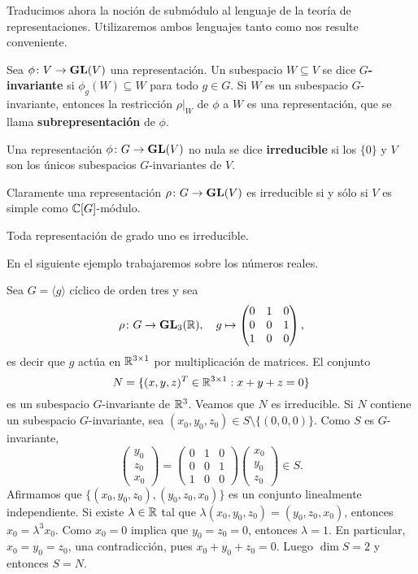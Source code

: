 Traducimos ahora la noción de submódulo al lenguaje de la teoría de representaciones. 
Utilizaremos ambos lenguajes tanto como nos resulte conveniente. 

\begin{definition}
Sea $\phi\colon V\to\mathbf{GL}(V)$ una representación. 
Un subespacio $W\subseteq V$ se dice
\textbf{$G$-invariante} si $\phi_g(W)\subseteq W$ para todo $g\in G$.  Si $W$
es un subespacio $G$-invariante, entonces la restricción $\rho|_W$ de $\phi$
a $W$ es una representación, que se llama \textbf{subrepresentación} de
$\phi$.
\end{definition}

\begin{definition}
Una representación $\phi\colon G\to\mathbf{GL}(V)$ no nula se dice \textbf{irreducible} si los $\{0\}$
y $V$ son los únicos subespacios $G$-invariantes de $V$.
\end{definition}

Claramente una representación $\rho\colon G\to\mathbf{GL}(V)$ es irreducible si y sólo si $V$ es
simple como $\mathbb{C}[G]$-módulo.

\begin{example}
  Toda representación de grado uno es irreducible.
\end{example}

En el siguiente ejemplo trabajaremos sobre los números reales. 

\begin{example}
Sea $G=\langle g\rangle$ cíclico de orden tres y sea 
\[
\rho\colon G\to\mathbf{GL}_3(\mathbb{R}),\quad
g\mapsto\begin{pmatrix}
  0&1&0\\
  0&0&1\\
  1&0&0
\end{pmatrix},
\]
es decir que $g$ actúa en $\mathbb{R}^{3\times1}$ por multiplicación de matrices. 
El conjunto
\[
N=\{(x,y,z)^T\in\mathbb{R}^{3\times1}:x+y+z=0\}
\]
es un subespacio $G$-invariante de $\mathbb{R}^3$. Veamos que $N$ es irreducible. Si $N$ contiene un subespacio $G$-invariante, 
sea $(x_0,y_0,z_0)\in S\setminus\{(0,0,0)\}$. Como $S$ es $G$-invariante, 
\[
\begin{pmatrix}
y_0\\
z_0\\
x_0
\end{pmatrix}
=
\begin{pmatrix}
  0&1&0\\
  0&0&1\\
  1&0&0
\end{pmatrix}
\begin{pmatrix}
x_0\\
y_0\\
z_0
\end{pmatrix}\in S.
\]
Afirmamos
que $\{(x_0,y_0,z_0),(y_0,z_0,x_0)\}$ es un conjunto linealmente independiente. Si existe $\lambda\in\mathbb{R}$ 
tal que $\lambda(x_0,y_0,z_0)=(y_0,z_0,x_0)$, entonces $x_0=\lambda^3 x_0$. Como $x_0=0$ implica que 
$y_0=z_0=0$, entonces $\lambda=1$. En particular, $x_0=y_0=z_0$, una contradicción, pues $x_0+y_0+z_0=0$. 
Luego $\dim S=2$ y entonces
$S=N$. 
\end{example}

